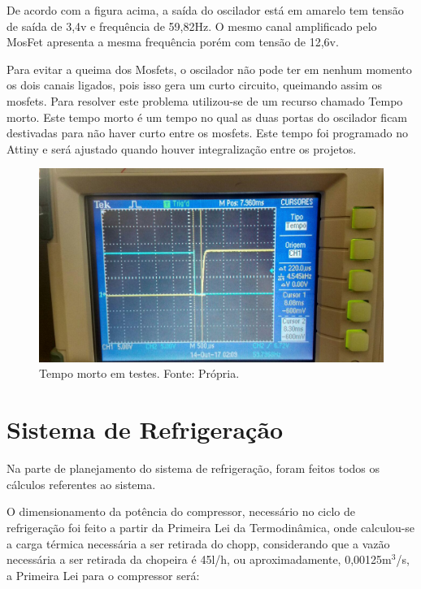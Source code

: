 				De acordo com a figura acima, a saída do oscilador está em amarelo tem tensão 					de saída de 3,4v e frequência de 59,82Hz. O mesmo canal amplificado pelo 						MosFet apresenta a mesma frequência porém com tensão de 12,6v. 
				
				Para evitar a queima dos Mosfets, o oscilador não pode ter em nenhum momento 					os dois canais ligados, pois isso gera um curto circuito, queimando assim os 					mosfets. Para resolver este problema utilizou-se de um recurso chamado Tempo 					morto. Este tempo morto é um tempo no qual as duas portas do oscilador ficam 					destivadas para não haver curto entre os mosfets. Este tempo foi programado no 				Attiny e será ajustado quando houver integralização entre os projetos.           
				
                \begin{figure}[!htb]
            		\centering
            		\includegraphics[scale= 0.2]{figuras/Tempo_morto.jpg}
            		\caption{Tempo morto em testes. Fonte: Própria.}
            		\label{tempo-morto}
            	\end{figure} 				 	         		
		
        \section[Sistema de Refrigeração]{Sistema de Refrigeração}

            Na parte de planejamento do sistema de refrigeração, foram feitos todos os
            cálculos referentes ao sistema. 

            O dimensionamento da potência do compressor, necessário no ciclo de
            refrigeração foi feito a partir da Primeira Lei da Termodinâmica, onde calculou-se a
            carga térmica necessária a ser retirada do chopp, considerando que a vazão
            necessária a ser retirada da chopeira é 45l/h, ou aproximadamente, 0,00125m$^3$/s, a
            Primeira Lei para o compressor será:
            

